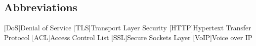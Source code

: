 \newcommand{\abbr}{Abbreviations}
\subsection{Abbreviations}

\begin{acronym}[1234567890]		%
\setlength{\itemsep}{-\parsep}	%

[DoS]{Denial of Service}
[TLS]{Transport Layer Security}
[HTTP]{Hypertext Transfer Protocol}
[ACL]{Access Control List}
[SSL]{Secure Sockets Layer}
[VoIP]{Voice over IP}

\end{acronym}
